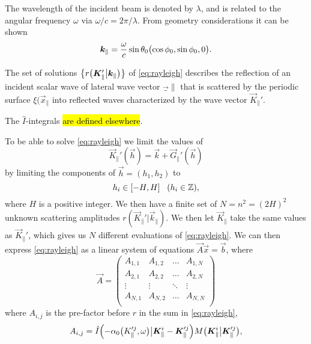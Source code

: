 The wavelength of the incident beam is denoted by $\lambda$, and is related to the angular frequency $\omega$ via $\omega/c = 2\pi/\lambda$. From geometry considerations it can be shown
\begin{equation}
    \vec k_\| = \frac{\omega}{c}\sin\theta_0 \del[1]{\cos\phi_0, \sin\phi_0, 0}.
\end{equation}

The set of solutions $\cbr[1]{r\del[1]{\vec K_{\|}'\big\vert \vec k_{\|}}}$ of \cref{eq:rayleigh} describes the reflection of an incident scalar wave of lateral wave vector $\vec_\|$ that is scattered by the periodic surface $\xi(\vec x_\|$ into reflected waves characterized by the wave vector $\vec K_\|'$.

The $\hat I$-integrals \hl{are defined elsewhere}.

To be able to solve \cref{eq:rayleigh} we limit the values of
\begin{equation}
    \vec K_{\|}'(\vec h) = \vec k + \vec G_\|'(\vec h)
\end{equation}
by limiting the components of $\vec h = (h_1, h_2)$ to
\begin{equation}
    h_i \in \sbr{-H, H} ~~(h_i \in \mathbb{Z}),
\end{equation}
where $H$ is a positive integer. We then have a finite set of $N = n^2 = (2H)^2$ unknown scattering amplitudes $r(\vec K_\|' \big\vert \vec k_\|)$. We then let $\vec K_\|$ take the same values as $\vec K_\|'$, which gives us $N$ different evaluations of \cref{eq:rayleigh}. We can then express \cref{eq:rayleigh} as a linear system of equations $\vec A \vec x = \vec b$, where
\begin{equation}
    \vec A =
    \begin{pmatrix}
        A_{1,1} & A_{1,2} & \dots  & A_{1,N} \\
        A_{2,1} & A_{2,2} & \dots  & A_{2,N} \\
        \vdots  & \vdots  & \ddots & \vdots  \\
        A_{N,1} & A_{N,2} & \dots  & A_{N,N} \\
    \end{pmatrix}
\end{equation}
where $A_{i, j}$ is the pre-factor before $r$ in the sum in \cref{eq:rayleigh},
\begin{equation}
    A_{i, j} = \hat I\del[2]{-\alpha_0 \del[1]{K_{\|}'^j, \omega} \big\vert \vec K_{\|}^i - \vec K_{\|}'^j} M\del[1]{\vec K_{\|}^i \big\vert \vec K_{\|}'^j},
\end{equation}

